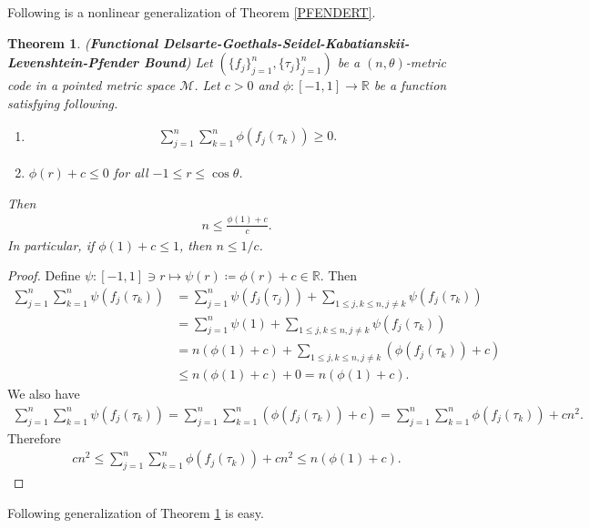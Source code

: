 \documentclass{amsart}
\newtheorem{theorem}{Theorem}[section]
\begin{document}
Following is a nonlinear generalization of Theorem \ref{PFENDERT}.
\begin{theorem} (\textbf{Functional Delsarte-Goethals-Seidel-Kabatianskii-Levenshtein-Pfender Bound}) \label{FDGSP}
	Let $ (\{f_j \}_{j=1}^n, \{\tau_j \}_{j=1}^n) $  be a  $(n,\theta )$-metric  code in a  pointed metric space $\mathcal{M}$. Let $c>0$ and $\phi:[-1,1]\to \mathbb{R}$ be a function satisfying following.
\begin{enumerate}[\upshape(i)]
	\item 
	\begin{align*}
		\sum_{j=1}^n\sum_{k =1}^n\phi(f_j(\tau_k))\geq 0.	
	\end{align*}
	\item $\phi(r)+c\leq 0$ for all $-1\leq r \leq \cos \theta$.
\end{enumerate}
Then 
\begin{align*}
	n\leq \frac{\phi(1)+c}{c}.
\end{align*}
In particular, if $\phi(1)+c\leq 1$, then $n\leq 1/c$.	
\end{theorem}
\begin{proof}
	Define $\psi:[-1,1]\ni r \mapsto \psi(r)\coloneqq \phi(r)+c\in \mathbb{R}$. Then 
	\begin{align*}
	\sum_{j=1}^n\sum_{k =1}^n\psi(f_j(\tau_k))&=\sum_{j=1}^{n}\psi(f_j(\tau_j))+\sum_{1\leq j,k \leq n, j \neq k}\psi(f_j(\tau_k))\\
	&=\sum_{j=1}^{n}\psi(1)+\sum_{1\leq j,k \leq n, j \neq k}\psi(f_j(\tau_k))\\
	&=n(\phi(1)+c)+\sum_{1\leq j,k \leq n, j \neq k}(\phi(f_j(\tau_k))+c)\\
	&\leq n(\phi(1)+c)+0=n(\phi(1)+c).
	\end{align*}
We also have 
\begin{align*}
	\sum_{j=1}^n\sum_{k =1}^n\psi(f_j(\tau_k))=	\sum_{j=1}^n\sum_{k =1}^n(\phi(f_j(\tau_k))+c)=	\sum_{j=1}^n\sum_{k =1}^n\phi(f_j(\tau_k))+cn^2.
\end{align*}
Therefore 
\begin{align*}
	cn^2\leq 	\sum_{j=1}^n\sum_{k =1}^n\phi(f_j(\tau_k))+cn^2\leq n(\phi(1)+c).
\end{align*}
\end{proof}
Following generalization of Theorem \ref{FDGSP} is easy.
\end{document}

